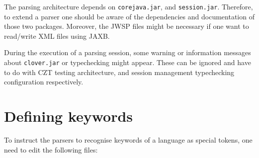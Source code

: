 \documentclass{article}
\begin{document}
The parsing architecture depends on \texttt{corejava.jar}, and
\texttt{session.jar}. Therefore, to extend a parser one should be aware of the
dependencies and documentation of those two packages. Moreover, the JWSP files
might be necessary if one want to read/write XML files using JAXB.

During the execution of a parsing session, some warning or information messages
about \texttt{clover.jar} or typechecking might appear. These can be ignored
and have to do with CZT testing architecture, and session management
typechecking configuration respectively.

\section{Defining keywords}\label{defining-keywords}

To instruct the parsers to recognise keywords of a language as special tokens,
one need to edit the following files:
\end{document}
